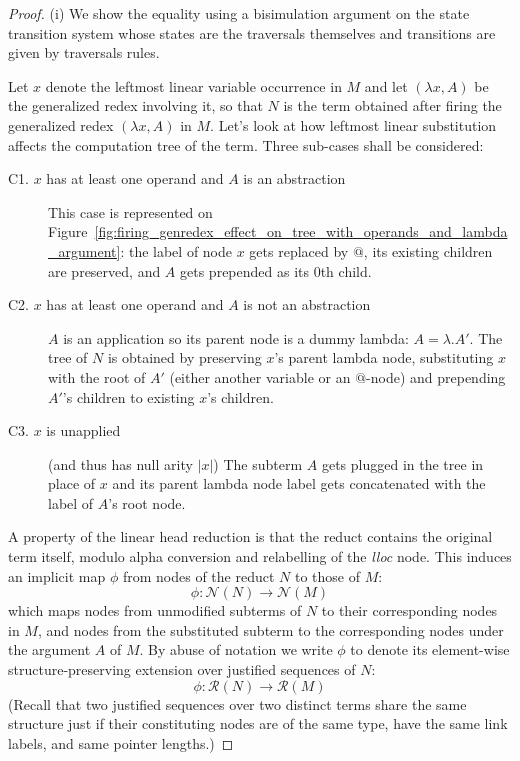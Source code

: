 \documentclass{article}
\theoremstyle{definition}
\newcommand\Nodes{\mathcal{N}}%
\def\relabjustseqset{\mathcal{R}}
\begin{document}
\begin{proof}
(i) We show the equality using a bisimulation argument on the state transition system whose states are the traversals themselves and transitions are given by traversals rules.

Let $x$ denote the leftmost linear variable occurrence in $M$
and let $(\lambda x, A)$ be the generalized redex involving it, so that $N$ is the term obtained after firing the generalized redex $(\lambda x, A)$ in $M$.
Let's look at how leftmost linear substitution affects the computation tree of the term. Three sub-cases shall be considered:
\begin{description}
    \item[C1. $x$ has at least one operand and $A$ is an abstraction]
    This case is represented on Figure~\ref{fig:firing_genredex_effect_on_tree_with_operands_and_lambda_argument}: the label of node $x$ gets replaced by $@$, its existing children are preserved, and $A$ gets prepended as its $0$th child.
    \item[C2. $x$ has at least one operand and $A$ is not an abstraction]
    $A$ is an application so its parent node is a dummy lambda: $A = \lambda. A'$. The tree of $N$ is obtained by preserving $x$'s parent lambda node, substituting $x$ with the root of $A'$ (either another variable or an $@$-node) and prepending $A'$'s children to existing $x$'s children.
    \item[C3. $x$ is unapplied] (and thus has null arity $|x|$)
    The subterm $A$ gets plugged in the tree in place of $x$ and its parent lambda node label gets concatenated with the label of $A$'s root node.
\end{description}

A property of the linear head reduction is that the reduct contains the original term itself, modulo alpha conversion and relabelling of the \emph{lloc} node. This induces an implicit map $\phi$ from nodes of the reduct $N$ to those of $M$:
$$\phi : \Nodes(N)  \rightarrow \Nodes(M) $$
which maps nodes from unmodified subterms of $N$ to their corresponding nodes in $M$, and nodes from the substituted subterm to the corresponding nodes under the argument $A$ of $M$. By abuse of notation we write $\phi$ to denote its element-wise structure-preserving extension over justified sequences of $N$:
$$\phi : \relabjustseqset(N)  \rightarrow \relabjustseqset(M) $$
(Recall that two justified sequences over two distinct terms share the same structure just if their constituting nodes are of the same type, have the same link labels, and same pointer lengths.)


\end{proof}
\end{document}
